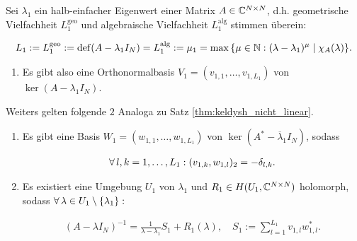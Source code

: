 \begin{proposition} \label{prop:keldysh_linear}

    Sei $\lambda_1$ ein halb-einfacher Eigenwert einer Matrix $A \in \mathbb{C}^{N \times N}$, d.h. geometrische Vielfachheit $L_1^\mathrm{geo}$ und algebraische Vielfachheit $L_1^\mathrm{alg}$ stimmen überein:

    \begin{align*}
        L_1
        :=
        L_1^\mathrm{geo} := \operatorname{def}(A - \lambda_1 I_N)
        =
        L_1^\mathrm{alg} := \mu_1 = \max {\left \{ \mu \in \mathbb{N}: (\lambda - \lambda_1)^\mu \mid \chi_A(\lambda) \right \}}.
    \end{align*}

    \begin{enumerate}[label = (\roman*)]
        \item Es gibt also eine Orthonormalbasis $V_1 = (v_{1, 1}, \dots, v_{1, L_1})$ von $\ker (A - \lambda_1 I_N)$.
    \end{enumerate}

    Weiters gelten folgende $2$ Analoga zu Satz \ref{thm:keldysh_nicht_linear}.

    \begin{enumerate}[label = (\roman*), start = 2]

        \item Es gibt eine Basis $W_1 = (w_{1, 1}, \dots, w_{1, L_1})$ von $\ker (A^\ast - \overline \lambda_1 I_N)$, sodass

        \begin{align*}
            \forall \, l, k = 1, \dots, L_1:
            (v_{1, k}, w_{1, l})_2 = -\delta_{l, k}.
        \end{align*}

        \item Es existiert eine Umgebung $U_1$ von $\lambda_1$ und $R_1 \in H(U_1, \mathbb{C}^{N \times N})$ holomorph, sodass $\forall \, \lambda \in U_1 \setminus {\left \{ \lambda_1 \right \}}:$

        \begin{align*}
            (A - \lambda I_N)^{-1}
            =
            \frac{1}{\lambda - \lambda_1} S_1
            +
            R_1(\lambda),
            \quad
            S_1
            :=
            \sum_{l=1}^{L_1}
                v_{1, l} w_{1, l}^\ast.
        \end{align*}

    \end{enumerate}

\end{proposition}
